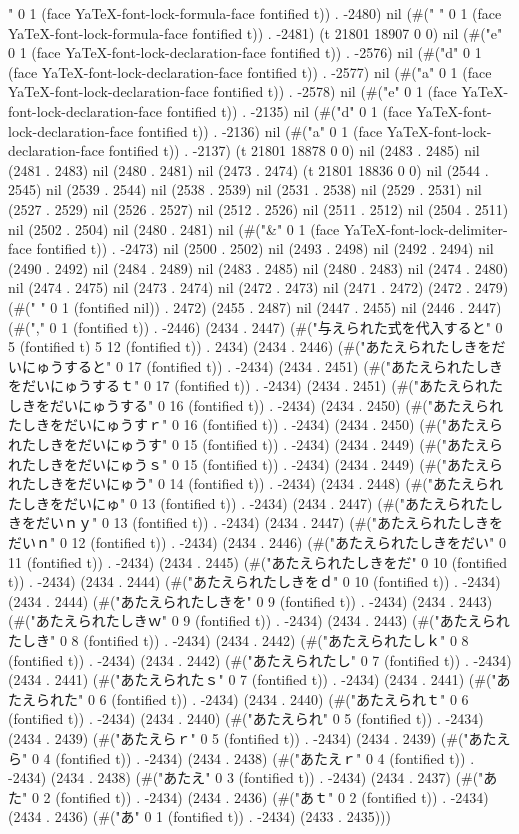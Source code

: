 " 0 1 (face YaTeX-font-lock-formula-face fontified t)) . -2480) nil (#("	" 0 1 (face YaTeX-font-lock-formula-face fontified t)) . -2481) (t 21801 18907 0 0) nil (#("e" 0 1 (face YaTeX-font-lock-declaration-face fontified t)) . -2576) nil (#("d" 0 1 (face YaTeX-font-lock-declaration-face fontified t)) . -2577) nil (#("a" 0 1 (face YaTeX-font-lock-declaration-face fontified t)) . -2578) nil (#("e" 0 1 (face YaTeX-font-lock-declaration-face fontified t)) . -2135) nil (#("d" 0 1 (face YaTeX-font-lock-declaration-face fontified t)) . -2136) nil (#("a" 0 1 (face YaTeX-font-lock-declaration-face fontified t)) . -2137) (t 21801 18878 0 0) nil (2483 . 2485) nil (2481 . 2483) nil (2480 . 2481) nil (2473 . 2474) (t 21801 18836 0 0) nil (2544 . 2545) nil (2539 . 2544) nil (2538 . 2539) nil (2531 . 2538) nil (2529 . 2531) nil (2527 . 2529) nil (2526 . 2527) nil (2512 . 2526) nil (2511 . 2512) nil (2504 . 2511) nil (2502 . 2504) nil (2480 . 2481) nil (#("&" 0 1 (face YaTeX-font-lock-delimiter-face fontified t)) . -2473) nil (2500 . 2502) nil (2493 . 2498) nil (2492 . 2494) nil (2490 . 2492) nil (2484 . 2489) nil (2483 . 2485) nil (2480 . 2483) nil (2474 . 2480) nil (2474 . 2475) nil (2473 . 2474) nil (2472 . 2473) nil (2471 . 2472) (2472 . 2479) (#("	" 0 1 (fontified nil)) . 2472) (2455 . 2487) nil (2447 . 2455) nil (2446 . 2447) (#("," 0 1 (fontified t)) . -2446) (2434 . 2447) (#("与えられた式を代入すると" 0 5 (fontified t) 5 12 (fontified t)) . 2434) (2434 . 2446) (#("あたえられたしきをだいにゅうすると" 0 17 (fontified t)) . -2434) (2434 . 2451) (#("あたえられたしきをだいにゅうするｔ" 0 17 (fontified t)) . -2434) (2434 . 2451) (#("あたえられたしきをだいにゅうする" 0 16 (fontified t)) . -2434) (2434 . 2450) (#("あたえられたしきをだいにゅうすｒ" 0 16 (fontified t)) . -2434) (2434 . 2450) (#("あたえられたしきをだいにゅうす" 0 15 (fontified t)) . -2434) (2434 . 2449) (#("あたえられたしきをだいにゅうｓ" 0 15 (fontified t)) . -2434) (2434 . 2449) (#("あたえられたしきをだいにゅう" 0 14 (fontified t)) . -2434) (2434 . 2448) (#("あたえられたしきをだいにゅ" 0 13 (fontified t)) . -2434) (2434 . 2447) (#("あたえられたしきをだいｎｙ" 0 13 (fontified t)) . -2434) (2434 . 2447) (#("あたえられたしきをだいｎ" 0 12 (fontified t)) . -2434) (2434 . 2446) (#("あたえられたしきをだい" 0 11 (fontified t)) . -2434) (2434 . 2445) (#("あたえられたしきをだ" 0 10 (fontified t)) . -2434) (2434 . 2444) (#("あたえられたしきをｄ" 0 10 (fontified t)) . -2434) (2434 . 2444) (#("あたえられたしきを" 0 9 (fontified t)) . -2434) (2434 . 2443) (#("あたえられたしきｗ" 0 9 (fontified t)) . -2434) (2434 . 2443) (#("あたえられたしき" 0 8 (fontified t)) . -2434) (2434 . 2442) (#("あたえられたしｋ" 0 8 (fontified t)) . -2434) (2434 . 2442) (#("あたえられたし" 0 7 (fontified t)) . -2434) (2434 . 2441) (#("あたえられたｓ" 0 7 (fontified t)) . -2434) (2434 . 2441) (#("あたえられた" 0 6 (fontified t)) . -2434) (2434 . 2440) (#("あたえられｔ" 0 6 (fontified t)) . -2434) (2434 . 2440) (#("あたえられ" 0 5 (fontified t)) . -2434) (2434 . 2439) (#("あたえらｒ" 0 5 (fontified t)) . -2434) (2434 . 2439) (#("あたえら" 0 4 (fontified t)) . -2434) (2434 . 2438) (#("あたえｒ" 0 4 (fontified t)) . -2434) (2434 . 2438) (#("あたえ" 0 3 (fontified t)) . -2434) (2434 . 2437) (#("あた" 0 2 (fontified t)) . -2434) (2434 . 2436) (#("あｔ" 0 2 (fontified t)) . -2434) (2434 . 2436) (#("あ" 0 1 (fontified t)) . -2434) (2433 . 2435)))
